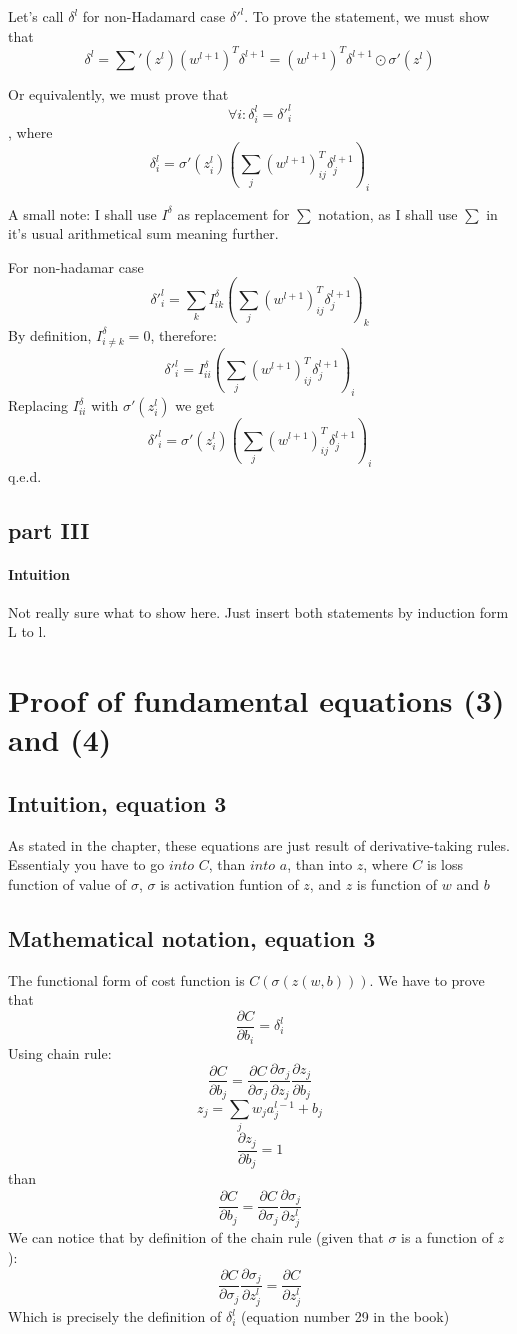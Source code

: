 \documentclass{article}
\begin{document}
Let's call $\delta^l$ for non-Hadamard case $\delta'^l$.
To prove the statement, we must show that 
$$\delta^l = {\sum}'(z^l) (w^{l+1})^{T} \delta^{l+1} = (w^{l+1})^{T} \delta^{l+1}\odot\sigma'(z^l)$$

Or equivalently, we must prove that $$\forall i: \delta^l_i = \delta'^l_i$$, where 
$$\delta^l_i = \sigma'(z_i^l) (\sum_j(w^{l+1})^T_{ij} \delta^{l+1}_j)_i$$

A small note: I shall use $I^{\delta}$ as replacement for $\sum$ notation, as I shall use $\sum$ in it's usual arithmetical sum meaning further.

For non-hadamar case
$$\delta'^l_i = \sum_k I^{\delta}_{ik} (\sum_j(w^{l+1})^T_{ij} \delta^{l+1}_j)_k$$
By definition, $I^{\delta}_{i \neq k} = 0$, therefore:
$$\delta'^l_i = I^{\delta}_{ii} (\sum_j(w^{l+1})^T_{ij} \delta^{l+1}_j)_i$$
Replacing $I^{\delta}_{ii}$ with $\sigma'(z_i^l)$ we get 
$$\delta'^l_i = \sigma'(z_i^l) (\sum_j(w^{l+1})^T_{ij} \delta^{l+1}_j)_i$$
q.e.d.

\subsection{part III}
\paragraph{Intuition}
Not really sure what to show here. Just insert both statements by induction form L to l.


\section{Proof of fundamental equations (3) and (4)}
\subsection{Intuition, equation 3}
As stated in the chapter, these equations are just result of derivative-taking rules.
Essentialy you have to go $into$ $C$, than $into$ $a$, than into $z$, where $C$ is loss function of value of $\sigma$, $\sigma$ is activation funtion of $z$, and $z$ is function of $w$ and $b$
\subsection{Mathematical notation, equation 3}
The functional form of cost function is $C(\sigma(z(w,b)))$.
We have to prove that 
$$\frac{\partial C}{\partial b_i} = \delta^l_i$$
Using chain rule:
$$\frac{\partial C}{\partial b_j} = \frac{\partial C}{\partial \sigma_j} \frac{\partial \sigma_j}{\partial z_j} \frac{\partial z_j}{\partial b_j}$$
$$z_j = \sum_jw_ja_j^{l-1} + b_j$$
$$\frac{\partial z_j}{\partial b_j} = 1$$
than 
$$\frac{\partial C}{\partial b_j} = \frac{\partial C}{\partial \sigma_j} \frac{\partial \sigma_j}{\partial z^l_j}$$
We can notice that by definition of the chain rule (given that $\sigma$ is a function of $z$):
$$\frac{\partial C}{\partial \sigma_j} \frac{\partial \sigma_j}{\partial z^l_j} = \frac{\partial C}{\partial z^l_j}$$
Which is precisely the definition of $\delta^l_i$ (equation number 29 in the book)
\end{document}
